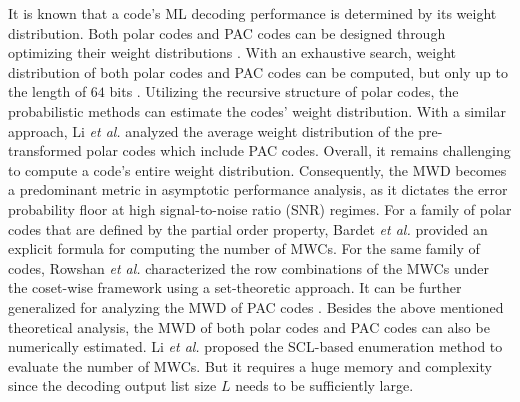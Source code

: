 \documentclass[12pt, draftclsnofoot, peerreview, onecolumn]{IEEEtran}
\theoremstyle{noparent}
\begin{document}
It is known that a code's ML decoding performance is determined by its
weight distribution. 
Both polar codes and PAC codes can be designed through optimizing their weight distributions 
\cite{MuradAbdullah2023NewSearchPolarization, Gelincik2022PreservingMinimumDistance, Rowshan2023FormationMinweight, Gu2023ImprovedConvolutionalPrecoder, Xu2017Distancespectrumoptimized}.
With an exhaustive search, weight distribution of both polar codes and PAC codes 
can be computed, but only up to the length of $64$ bits \cite{MuradAbdullah2023NewSearchPolarization}\cite{Xu2017Distancespectrumoptimized}.
Utilizing the recursive structure of polar codes, 
the probabilistic methods \cite{Valipour2013ProbabilisticWeightDistribution}\cite{Zhang2017EnhancedProbabilisticComputation} 
can estimate the codes' weight distribution. 
With a similar approach, Li {\em et al.} \cite{Li2021WeightSpectrumPrea} analyzed the average weight distribution
of the pre-transformed polar codes which include PAC codes. 
Overall, it remains challenging to compute a code's entire weight distribution.
Consequently, the MWD becomes a predominant metric in asymptotic performance analysis, as it dictates the error probability floor at high signal-to-noise ratio (SNR) regimes\cite{ShuLin2004ErrorControlCoding}.
For a family of polar codes that are defined by the partial order property, 
Bardet {\em et al.} \cite{Bardet2016Algebraicpropertiespolar_conf} provided an explicit formula 
for computing the number of MWCs. 
For the same family of codes, 
Rowshan {\em et al.} \cite{Rowshan2023FormationMinweight} characterized the row combinations of 
the MWCs under the coset-wise framework using a set-theoretic approach. 
It can be further generalized for analyzing the MWD of PAC codes \cite{Rowshan2023MinimumWeightCodewords}. 
Besides the above mentioned theoretical analysis, 
the MWD of both polar codes and PAC codes can also be numerically estimated. 
Li {\em et al.} \cite{Li2012AdaptiveSuccessiveCancellation} proposed the 
SCL-based enumeration method to evaluate the number of MWCs. But it requires a huge memory and complexity since the decoding output list size $L$ needs to be sufficiently large.
\end{document}
